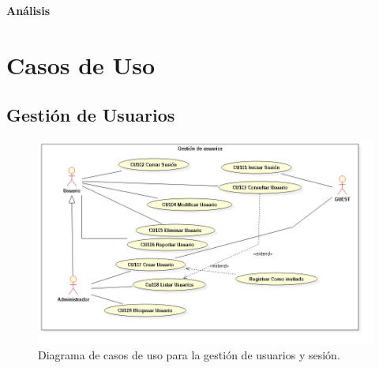 \newpage{\pagestyle{empty}\cleardoublepage}
\newpage
\vspace*{\fill}
    \begin{center}
      \thispagestyle{empty} \vspace*{0cm} \textbf{\huge
An\'{a}lisis}
    \end{center}
    \vspace*{\fill}
\newpage{\pagestyle{empty}\cleardoublepage}
\chapter{Casos de Uso}
\section{Gesti\'{o}n de Usuarios}

\begin{figure}[h]
\centering
\includegraphics[width=1\textwidth]{Img/CasosDeUso/DCU01.jpg}
\caption{Diagrama de casos de uso para la gesti\'{o}n de usuarios y sesi\'{o}n.}
\label{fig:dcu}
\end{figure}
